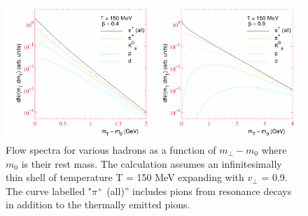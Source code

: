 \documentclass[12pt,a4paper]{book}
\begin{document}
	
	\begin{figure}[ht]
		\centering
		\includegraphics[width=0.8\linewidth]{pictures/flow_spectra.png}
		\caption{Flow spectra for various hadrons as a function of $m_\perp-m_0$ where $m_0$ is their rest mass. The calculation assumes an infinitesimally thin shell of temperature T = 150 MeV expanding with $v_\perp$ = 0.9. The curve labelled "$\pi^+$ (all)” includes pions from resonance decays in addition to the thermally emitted pions.}
		\label{fig:flow_spectra} 
	\end{figure}
	\FloatBarrier
\end{document}
